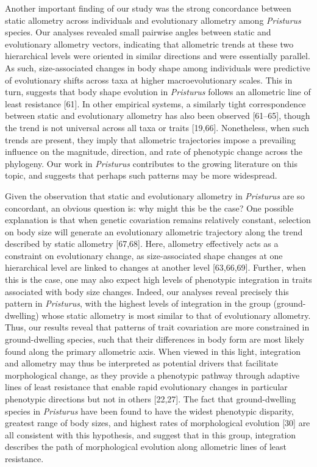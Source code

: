 \documentclass[
  11pt,
]{article}
\begin{document}
Another important finding of our study was the strong concordance
between static allometry across individuals and evolutionary allometry
among \emph{Pristurus} species. Our analyses revealed small pairwise
angles between static and evolutionary allometry vectors, indicating
that allometric trends at these two hierarchical levels were oriented in
similar directions and were essentially parallel. As such,
size-associated changes in body shape among individuals were predictive
of evolutionary shifts across taxa at higher macroevolutionary scales.
This in turn, suggests that body shape evolution in \emph{Pristurus}
follows an allometric line of least resistance {[}61{]}. In other
empirical systems, a similarly tight correspondence between static and
evolutionary allometry has also been observed {[}61--65{]}, though the
trend is not universal across all taxa or traits {[}19,66{]}.
Nonetheless, when such trends are present, they imply that allometric
trajectories impose a prevailing influence on the magnitude, direction,
and rate of phenotypic change across the phylogeny. Our work in
\emph{Pristurus} contributes to the growing literature on this topic,
and suggests that perhaps such patterns may be more
widespread.\hfill\break

Given the observation that static and evolutionary allometry in
\emph{Pristurus} are so concordant, an obvious question is: why might
this be the case? One possible explanation is that when genetic
covariation remains relatively constant, selection on body size will
generate an evolutionary allometric trajectory along the trend described
by static allometry {[}67,68{]}. Here, allometry effectively acts as a
constraint on evolutionary change, as size-associated shape changes at
one hierarchical level are linked to changes at another level
{[}63,66,69{]}. Further, when this is the case, one may also expect high
levels of phenotypic integration in traits associated with body size
changes. Indeed, our analyses reveal precisely this pattern in
\emph{Pristurus}, with the highest levels of integration in the group
(ground-dwelling) whose static allometry is most similar to that of
evolutionary allometry. Thus, our results reveal that patterns of trait
covariation are more constrained in ground-dwelling species, such that
their differences in body form are most likely found along the primary
allometric axis. When viewed in this light, integration and allometry
may thus be interpreted as potential drivers that facilitate
morphological change, as they provide a phenotypic pathway through
adaptive lines of least resistance that enable rapid evolutionary
changes in particular phenotypic directions but not in others
{[}22,27{]}. The fact that ground-dwelling species in \emph{Pristurus}
have been found to have the widest phenotypic disparity, greatest range
of body sizes, and highest rates of morphological evolution {[}30{]} are
all consistent with this hypothesis, and suggest that in this group,
integration describes the path of morphological evolution along
allometric lines of least resistance. \hfill\break
\end{document}
